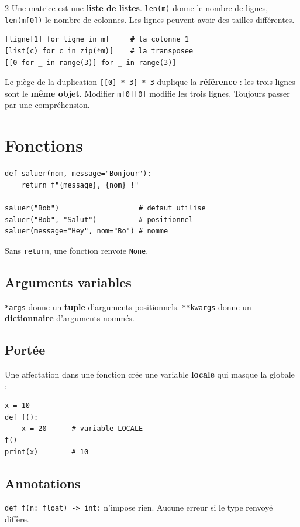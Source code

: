 \documentclass[a4paper,10pt]{article}
\newcommand{\co}[1]{\texttt{\textcolor{codefg}{#1}}}
\begin{document}
\begin{multicols}{2}
Une matrice est une \textbf{liste de listes}. \co{len(m)} donne le nombre de
lignes, \co{len(m[0])} le nombre de colonnes. Les lignes peuvent avoir des
tailles différentes.

\begin{lstlisting}
[ligne[1] for ligne in m]     # la colonne 1
[list(c) for c in zip(*m)]    # la transposee
[[0 for _ in range(3)] for _ in range(3)]
\end{lstlisting}

\begin{piegebox}{Le piège de la duplication}
\co{[[0] * 3] * 3} duplique la \textbf{référence} : les trois lignes sont le
\textbf{même objet}. Modifier \co{m[0][0]} modifie les trois lignes. Toujours
passer par une compréhension.
\end{piegebox}

\section{Fonctions}

\begin{lstlisting}
def saluer(nom, message="Bonjour"):
    return f"{message}, {nom} !"

saluer("Bob")                   # defaut utilise
saluer("Bob", "Salut")          # positionnel
saluer(message="Hey", nom="Bo") # nomme
\end{lstlisting}

Sans \co{return}, une fonction renvoie \co{None}.

\subsection{Arguments variables}
\co{*args} donne un \textbf{tuple} d'arguments positionnels.
\co{**kwargs} donne un \textbf{dictionnaire} d'arguments nommés.

\subsection{Portée}
Une affectation dans une fonction crée une variable \textbf{locale} qui masque
la globale :

\begin{lstlisting}
x = 10
def f():
    x = 20      # variable LOCALE
f()
print(x)        # 10
\end{lstlisting}

\subsection{Annotations}
\co{def f(n: float) -> int:} n'impose rien. Aucune erreur si le type renvoyé
diffère.


\end{multicols}
\end{document}
